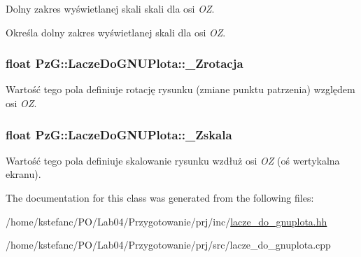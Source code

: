 Dolny zakres wyświetlanej skali skali dla osi {\itshape O\+Z}. 

Określa dolny zakres wyświetlanej skali dla osi {\itshape O\+Z}. \hypertarget{class_pz_g_1_1_lacze_do_g_n_u_plota_aa65781b1ff96dfb31a780e98ee28d6ed}{
\subsubsection[{\+\_\+\+Zrotacja}]{\setlength{\rightskip}{0pt plus 5cm}float Pz\+G\+::\+Lacze\+Do\+G\+N\+U\+Plota\+::\+\_\+\+Zrotacja\hspace{0.3cm}{\ttfamily [protected]}}}\label{class_pz_g_1_1_lacze_do_g_n_u_plota_aa65781b1ff96dfb31a780e98ee28d6ed}
Wartość tego pola definiuje rotację rysunku (zmiane punktu patrzenia) względem osi {\itshape O\+Z}. \hypertarget{class_pz_g_1_1_lacze_do_g_n_u_plota_a85446d06b2d714b2f852ef43c47c73c1}{
\subsubsection[{\+\_\+\+Zskala}]{\setlength{\rightskip}{0pt plus 5cm}float Pz\+G\+::\+Lacze\+Do\+G\+N\+U\+Plota\+::\+\_\+\+Zskala\hspace{0.3cm}{\ttfamily [protected]}}}\label{class_pz_g_1_1_lacze_do_g_n_u_plota_a85446d06b2d714b2f852ef43c47c73c1}
Wartość tego pola definiuje skalowanie rysunku wzdłuż osi {\itshape O\+Z} (oś wertykalna ekranu). 

The documentation for this class was generated from the following files\+:\begin{DoxyCompactItemize}
\item 
/home/kstefanc/\+P\+O/\+Lab04/\+Przygotowanie/prj/inc/\hyperlink{lacze__do__gnuplota_8hh}{lacze\+\_\+do\+\_\+gnuplota.\+hh}\item 
/home/kstefanc/\+P\+O/\+Lab04/\+Przygotowanie/prj/src/lacze\+\_\+do\+\_\+gnuplota.\+cpp\end{DoxyCompactItemize}

